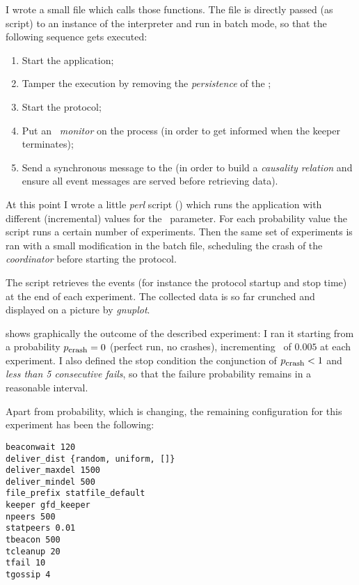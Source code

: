 I wrote a small file which calls those functions. The file is directly
passed (as script) to an instance of the interpreter and run in batch
mode, so that the following sequence gets executed:
\begin{enumerate}
\item   Start the application;
\item   Tamper the execution by removing the \emph{persistence} of the
        ;
\item   Start the protocol;
\item   Put an \emph{\Erlang\ monitor} on the  process
        (in order to get informed when the keeper terminates);
\item   Send a synchronous message to the  (in
        order to build a \emph{causality relation} and ensure all event
        messages are served before retrieving data).
\end{enumerate}


At this point I wrote a little \emph{perl} script
() which runs the application with different
(incremental) values for the \PCrash\ parameter. For each probability
value the script runs a certain number of experiments. Then the same set
of experiments is ran with a small modification in the batch file,
scheduling the crash of the \emph{coordinator} before starting the
protocol.

The script retrieves the events (for instance the protocol startup and
stop time) at the end of each experiment. The collected data is so far
crunched and displayed on a picture by \emph{gnuplot}.


 shows graphically the outcome of the described
experiment: I ran it starting from a probability ${p}_{\mbox{\footnotesize{crash}}} = 0$
(perfect run, no crashes), incrementing \PCrash\ of $0.005$ at each
experiment. I also defined the stop condition the conjunction of ${p}_{\mbox{\footnotesize{crash}}}
< 1$ and \emph{less than 5 consecutive fails}, so that the failure
probability remains in a reasonable interval.

Apart from probability, which is changing, the remaining configuration for
this experiment has been the following:
\begin{verbatim}
beaconwait 120
deliver_dist {random, uniform, []}
deliver_maxdel 1500
deliver_mindel 500
file_prefix statfile_default
keeper gfd_keeper
npeers 500
statpeers 0.01
tbeacon 500
tcleanup 20
tfail 10
tgossip 4
\end{verbatim}


